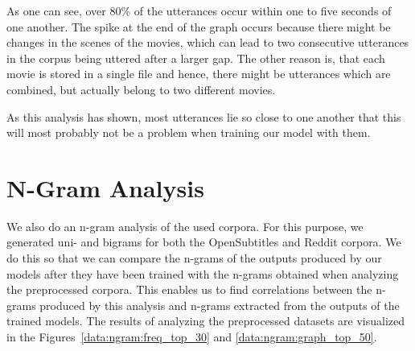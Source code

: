 As one can see, over 80\% of the utterances occur within one to five seconds of one another. The spike at the end of the graph occurs because there might be changes in the scenes of the movies, which can lead to two consecutive utterances in the corpus being uttered after a larger gap. The other reason is, that each movie is stored in a single file and hence, there might be utterances which are combined, but actually belong to two different movies.

As this analysis has shown, most utterances lie so close to one another that this will most probably not be a problem when training our model with them.

\section{N-Gram Analysis}
\label{chapter:data:ngram}
We also do an n-gram analysis of the used corpora. For this purpose, we generated uni- and bigrams for both the OpenSubtitles and Reddit corpora. We do this so that we can compare the n-grams of the outputs produced by our models after they have been trained with the n-grams obtained when analyzing the preprocessed corpora. This enables us to find correlations between the n-grams produced by this analysis and n-grams extracted from the outputs of the trained models. The results of analyzing the preprocessed datasets are visualized in the Figures~\ref{data:ngram:freq_top_30} and \ref{data:ngram:graph_top_50}.
 
